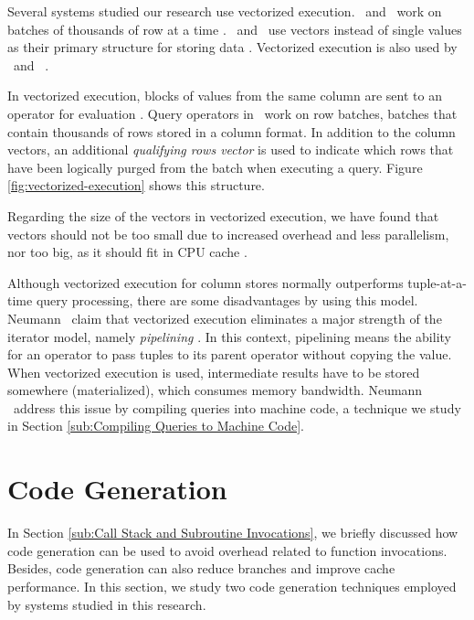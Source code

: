 Several systems studied our research use vectorized execution. \ibm~and \mssql~work on batches of thousands of row at a time \cite{Larson2013-mc, Raman2013-em}. \monetdb~and \monetx~use vectors instead of single values as their primary structure for storing data \cite{Boncz2005-wj, Boncz2002-yj}. Vectorized execution is also used by \cstore~and \blink~\cite{Johnson2008-cp, Stonebraker2005-qz}.

In vectorized execution, blocks of values from the same column are sent to an operator for evaluation \cite{Zukowski2006-oz}. Query operators in \mssql~work on row batches, batches that contain thousands of rows stored in a column format. In addition to the column vectors, an additional \textit{qualifying rows vector} is used to indicate which rows that have been logically purged from the batch when executing a query. Figure \ref{fig:vectorized-execution} shows this structure.

Regarding the size of the vectors in vectorized execution, we have found that vectors should not be too small due to increased overhead and less parallelism, nor too big, as it should fit in CPU cache \cite{Boncz2005-wj}.

Although vectorized execution for column stores normally outperforms tuple-at-a-time query processing, there are some disadvantages by using this model. Neumann \ea~claim that vectorized execution eliminates a major strength of the iterator model, namely \textit{pipelining} \cite{Neumann2011-uq}. In this context, pipelining means the ability for an operator to pass tuples to its parent operator without copying the value. When vectorized execution is used, intermediate results have to be stored somewhere (materialized), which consumes memory bandwidth. Neumann \ea~address this issue by compiling queries into machine code, a technique we study in Section \ref{sub:Compiling Queries to Machine Code}.

\section{Code Generation}
\label{sec:Code Generation}
In Section \ref{sub:Call Stack and Subroutine Invocations}, we briefly discussed how code generation can be used to avoid overhead related to function invocations. Besides, code generation can also reduce branches and improve cache performance. In this section, we study two code generation techniques employed by systems studied in this research.



